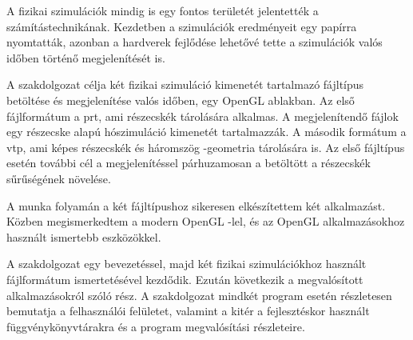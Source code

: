 A fizikai szimulációk mindig is egy fontos
területét jelentették a számítástechnikának.
Kezdetben a szimulációk eredményeit egy papírra nyomtatták,
azonban a hardverek fejlődése lehetővé tette
a szimulációk valós időben történő megjelenítését is.

A szakdolgozat célja 
két fizikai szimuláció kimenetét tartalmazó
fájltípus betöltése és megjelenítése valós időben,
egy OpenGL ablakban.
Az első fájlformátum a prt, 
ami részecskék tárolására alkalmas.
A megjelenítendő fájlok egy részecske alapú hószimuláció
kimenetét tartalmazzák.
A második formátum a vtp,
ami képes részecskék és háromszög -geometria tárolására is.
Az első fájltípus esetén további cél
a megjelenítéssel párhuzamosan
a betöltött a részecskék sűrűségének növelése.

A munka folyamán a két fájltípushoz 
sikeresen elkészítettem két alkalmazást.
Közben megismerkedtem a modern OpenGL -lel, 
és az OpenGL alkalmazásokhoz 
használt ismertebb eszközökkel.
 
A szakdolgozat egy bevezetéssel, 
majd két fizikai szimulációkhoz használt 
fájlformátum ismertetésével kezdődik.
Ezután következik a megvalósított alkalmazásokról
szóló rész.
A szakdolgozat mindkét program esetén 
részletesen bemutatja a felhasználói felületet,
valamint a kitér 
a fejlesztéskor használt függvénykönyvtárakra
és a program megvalósítási részleteire.










